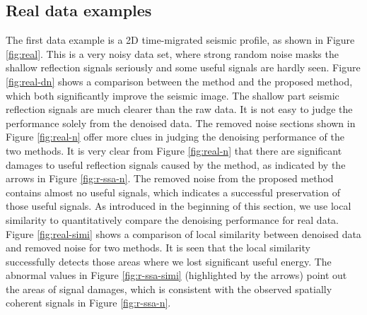 \subsection{Real data examples}
The first  data example is a 2D time-migrated seismic profile, as shown in Figure \ref{fig:real}. This is a very noisy data set, where strong random noise masks the shallow reflection signals seriously and some useful signals are hardly seen. Figure \ref{fig:real-dn} shows a comparison between the  method and the proposed method, which both significantly improve the seismic image. The shallow part seismic reflection signals are much clearer than the raw data. It is not easy to judge the performance solely from the denoised data. The removed noise sections shown in Figure \ref{fig:real-n} offer more clues in judging the denoising performance of the two methods. It is very clear from Figure \ref{fig:real-n} that there are significant damages to useful reflection signals caused by the  method, as indicated by the arrows in Figure \ref{fig:r-ssa-n}. The removed noise from the proposed method contains almost no useful signals, which indicates a successful preservation of those useful signals.  As introduced in the beginning of this section, we use local similarity to quantitatively compare the denoising performance for real data. Figure \ref{fig:real-simi} shows a comparison of local similarity between denoised data and removed noise for two methods. It is seen that the local similarity successfully detects those areas where we lost significant useful energy. The abnormal values in Figure \ref{fig:r-ssa-simi} (highlighted by the arrows) point out the areas of signal damages, which is consistent with the observed spatially coherent signals in Figure \ref{fig:r-ssa-n}. 

